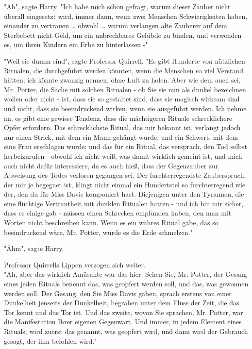 {"Ah", sagte Harry. "Ich habe mich schon gefragt, warum dieser Zauber nicht überall eingesetzt wird, immer dann, wenn zwei Menschen Schwierigkeiten haben, einander zu vertrauen … obwohl … warum verlangen alte Zauberer auf dem Sterbebett nicht Geld, um ein unbrechbares Gelübde zu binden, und verwenden es, um ihren Kindern ein Erbe zu hinterlassen -"

"Weil sie dumm sind", sagte Professor Quirrell. "Es gibt Hunderte von nützlichen Ritualen, die durchgeführt werden könnten, wenn die Menschen so viel Verstand hätten; ich könnte zwanzig nennen, ohne Luft zu holen. Aber wie dem auch sei, Mr. Potter, die Sache mit solchen Ritualen - ob Sie sie nun als dunkel bezeichnen wollen oder nicht - ist, dass sie so gestaltet sind, dass sie magisch wirksam sind und nicht, dass sie beeindruckend wirken, wenn sie ausgeführt werden. Ich nehme an, es gibt eine gewisse Tendenz, dass die mächtigeren Rituale schrecklichere Opfer erfordern. Das schrecklichste Ritual, das mir bekannt ist, verlangt jedoch nur einen Strick, mit dem ein Mann gehängt wurde, und ein Schwert, mit dem eine Frau erschlagen wurde; und das für ein Ritual, das versprach, den Tod selbst herbeizurufen - obwohl ich nicht weiß, was damit wirklich gemeint ist, und mich auch nicht dafür interessiere, da es auch hieß, dass der Gegenzauber zur Abweisung des Todes verloren gegangen sei. Der furchterregendste Zauberspruch, der mir je begegnet ist, klingt nicht einmal ein Hundertstel so furchterregend wie der, den du für Miss Davis komponiert hast. Diejenigen unter den Tyrannen, die eine flüchtige Vertrautheit mit dunklen Ritualen hatten - und ich bin mir sicher, dass es einige gab - müssen einen Schrecken empfunden haben, den man mit Worten nicht beschreiben kann. Wenn es ein wahres Ritual gäbe, das so beeindruckend wäre, Mr. Potter, würde es die Erde schmelzen."

"Ähm", sagte Harry.

Professor Quirrells Lippen verzogen sich weiter.\\ "Ah, aber das wirklich Amüsante war das hier. Sehen Sie, Mr. Potter, der Gesang eines jeden Rituals benennt das, was geopfert werden soll, und das, was gewonnen werden soll. Der Gesang, den Sie Miss Davis gaben, sprach erstens von einer Dunkelheit jenseits der Dunkelheit, begraben unter dem Fluss der Zeit, die das Tor kennt und das Tor ist. Und das zweite, wovon Sie sprachen, Mr. Potter, war die Manifestation Ihrer eigenen Gegenwart. Und immer, in jedem Element eines Rituals, wird zuerst das genannt, was geopfert wird, und dann wird der Gebrauch gesagt, der ihm befohlen wird."

}
